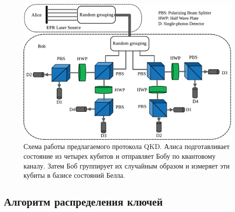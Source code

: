 \documentclass[a4paper,11pt]{article}
\begin{document}
\begin{figure}[h!]
	\centering    
	\includegraphics[width=0.7\columnwidth]{scheme.png}
	\caption{Схема работы предлагаемого протокола QKD. Алиса подготавливает состояние из четырех кубитов и отправляет Бобу по квантовому каналу. Затем Боб группирует их случайным образом и измеряет эти кубиты в базисе состояний Белла.}
	\label{im1}
\end{figure}


\subsection{Алгоритм распределения ключей}
\end{document}
